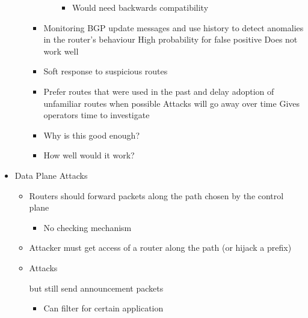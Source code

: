 \begin{itemize}
\begin{itemize}
\begin{itemize}
\begin{itemize}
\begin{itemize}
                                    \item Would need backwards compatibility
                                \end{itemize}
                        \end{itemize}
                \end{itemize}
                \begin{itemize}
                    \item Monitoring BGP update messages and use history to detect anomalies in the router's behaviour
                    \icon High probability for false positive
                    \icon Does not work well
                \end{itemize}
                \begin{itemize}
                    \item Soft response to suspicious routes
                    \item Prefer routes that were used in the past and delay adoption of unfamiliar routes when possible
                    \ipro Attacks will go away over time
                    \ipro Gives operators time to investigate
                    \item Why is this good enough?
                    \item How well would it work?
                \end{itemize}
        \end{itemize}
    \item Data Plane Attacks
        \begin{itemize}
            \item Routers should forward packets along the path chosen by the control plane
                \begin{itemize}
                    \item No checking mechanism
                \end{itemize}
            \item Attacker must get access of a router along the path (or hijack a prefix)
            \item Attacks
                \begin{itemize}
                     but still send announcement packets
                        \begin{itemize}
                            \item Can filter for certain application

\end{itemize}
\end{itemize}
\end{itemize}
\end{itemize}
